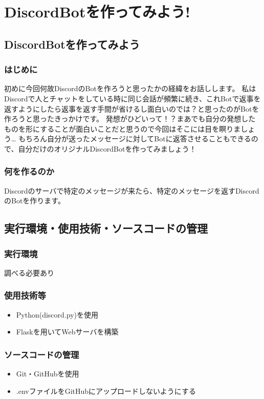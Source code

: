 \chapter{DiscordBotを作ってみよう!}

\section{DiscordBotを作ってみよう}
\subsection{はじめに}
初めに今回何故DiscordのBotを作ろうと思ったかの経緯をお話しします。
私はDiscordで人とチャットをしている時に同じ会話が頻繁に続き、これBotで返事を返すようにしたら返事を返す手間が省けるし面白いのでは？と思ったのがBotを作ろうと思ったきっかけです。
発想がひどいって！？まあでも自分の発想したものを形にすることが面白いことだと思うので今回はそこには目を瞑りましょう…
もちろん自分が送ったメッセージに対してBotに返答させることもできるので、自分だけのオリジナルDiscordBotを作ってみましょう！

\subsection{何を作るのか}
Discordのサーバで特定のメッセージが来たら、特定のメッセージを返すDiscordのBotを作ります。

\section{実行環境・使用技術・ソースコードの管理}
\subsection*{実行環境}
調べる必要あり
\subsection*{使用技術等}
\begin{itemize}
  \item Python(discord.py)を使用
  \item Flaskを用いてWebサーバを構築
\end{itemize}
\subsection*{ソースコードの管理}
\begin{itemize}
  \item Git・GitHubを使用
  \item .envファイルをGitHubにアップロードしないようにする
\end{itemize}

